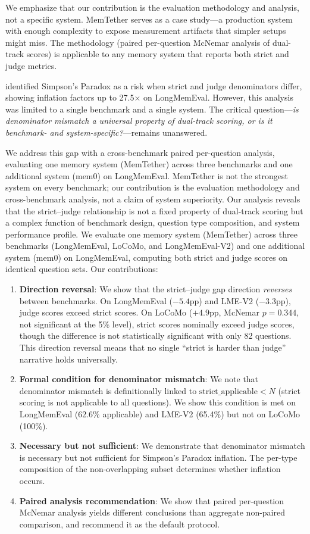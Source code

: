 \documentclass{article}
\begin{document}
We emphasize that our contribution is the evaluation methodology and analysis, not a specific system. MemTether serves as a case study—a production system with enough complexity to expose measurement artifacts that simpler setups might miss. The methodology (paired per-question McNemar analysis of dual-track scores) is applicable to any memory system that reports both strict and judge metrics.

\citet{anonymous2026simpson} identified Simpson's Paradox as a risk when strict and judge denominators differ, showing inflation factors up to 27.5$\times$ on LongMemEval. However, this analysis was limited to a single benchmark and a single system. The critical question---\emph{is denominator mismatch a universal property of dual-track scoring, or is it benchmark- and system-specific?}---remains unanswered.

We address this gap with a cross-benchmark paired per-question analysis, evaluating one memory system (MemTether) across three benchmarks and one additional system (mem0) on LongMemEval. MemTether is not the strongest system on every benchmark; our contribution is the evaluation methodology and cross-benchmark analysis, not a claim of system superiority. Our analysis reveals that the strict--judge relationship is not a fixed property of dual-track scoring but a complex function of benchmark design, question type composition, and system performance profile. We evaluate one memory system (MemTether) across three benchmarks (LongMemEval, LoCoMo, and LongMemEval-V2) and one additional system (mem0) on LongMemEval, computing both strict and judge scores on identical question sets. Our contributions:

\begin{enumerate}
\item \textbf{Direction reversal}: We show that the strict--judge gap direction \emph{reverses} between benchmarks. On LongMemEval ($-5.4$pp) and LME-V2 ($-3.3$pp), judge scores exceed strict scores. On LoCoMo ($+4.9$pp, McNemar $p = 0.344$, not significant at the 5\% level), strict scores nominally exceed judge scores, though the difference is not statistically significant with only 82 questions. This direction reversal means that no single ``strict is harder than judge'' narrative holds universally.
\item \textbf{Formal condition for denominator mismatch}: We note that denominator mismatch is definitionally linked to $\text{strict\_applicable} < N$ (strict scoring is not applicable to all questions). We show this condition is met on LongMemEval (62.6\% applicable) and LME-V2 (65.4\%) but not on LoCoMo (100\%).
\item \textbf{Necessary but not sufficient}: We demonstrate that denominator mismatch is necessary but not sufficient for Simpson's Paradox inflation. The per-type composition of the non-overlapping subset determines whether inflation occurs.
\item \textbf{Paired analysis recommendation}: We show that paired per-question McNemar analysis yields different conclusions than aggregate non-paired comparison, and recommend it as the default protocol.
\end{enumerate}
\end{document}
